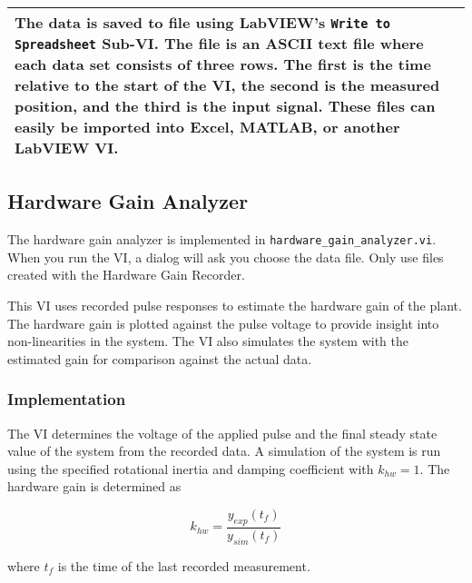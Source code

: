 \begin{center}\begin{tabular}{|p{}|}
\hline The data is saved to file using LabVIEW's \texttt{Write to
Spreadsheet} Sub-VI.  The file is an ASCII text file where each data
set consists of three rows.  The first is the time relative to the
start of the VI, the second is the measured position, and the third is
the input signal.  These files can easily be imported into Excel,
MATLAB, or another LabVIEW VI. \\ \hline
\end{tabular}\end{center}

\subsection{Hardware Gain Analyzer}

The hardware gain analyzer is implemented in
\texttt{hardware\_gain\_analyzer.vi}.  When you run the VI, a dialog
will ask you choose the data file.  Only use files created with the
Hardware Gain Recorder.
   
This VI uses recorded pulse responses to estimate the hardware gain of
the plant.  The hardware gain is plotted against the pulse voltage to
provide insight into non-linearities in the system.  The VI also
simulates the system with the estimated gain for comparison against
the actual data.


\subsubsection{Implementation}

The VI determines the voltage of the applied pulse and the final
steady state value of the system from the recorded data. A simulation
of the system is run using the specified rotational inertia and
damping coefficient with $k_{hw}=1$.  The hardware gain is determined as

\begin{equation}
k_{hw} = \frac{y_{exp}(t_f)}{y_{sim}(t_f)}
\end{equation}

where $t_f$ is the time of the last recorded measurement.